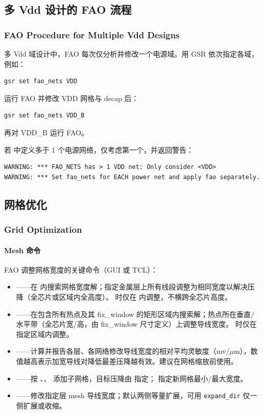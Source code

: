 \label{fig:rh-fao-static-flow}

\subsection{多 Vdd 设计的 FAO 流程}
\subsubsection*{FAO Procedure for Multiple Vdd Designs}

多 Vdd 域设计中，FAO 每次仅分析并修改一个电源域。用 GSR  依次指定各域，例如：
\begin{lstlisting}
gsr set fao_nets VDD
\end{lstlisting}
运行 FAO 并修改 VDD 网格与 decap 后：
\begin{lstlisting}
gsr set fao_nets VDD_B
\end{lstlisting}
再对 VDD\_B 运行 FAO。

若  中定义多于 1 个电源网络，仅考虑第一个，并返回警告：
\begin{lstlisting}
WARNING: *** FAO_NETS has > 1 VDD net: Only consider <VDD>
WARNING: *** Set fao_nets for EACH power net and apply fao separately.
\end{lstlisting}

\subsection{网格优化}
\subsubsection*{Grid Optimization}

\paragraph{Mesh 命令}
FAO 调整网格宽度的关键命令（GUI 或 TCL）：
\begin{itemize}
  \item {}——在  内搜索网格宽度解；指定金属层上所有线段调整为相同宽度以解决压降（全芯片或区域内全高度）。 时仅在  内调整，不横跨全芯片高度。
  \item {}——在包含所有热点及其 fix\_window 的矩形区域内搜索解；热点所在垂直/水平带（全芯片宽/高，由 fix\_window 尺寸定义）上调整导线宽度。 时仅在指定区域内调整。
  \item {}——计算并报告各层、各网络修改导线宽度的相对平均灵敏度（mv/$\mu$m），数值越高表示加宽导线对降低最差压降越有效。建议在网格缩放前使用。
  \item {}——按 、、 添加子网格，目标压降由  指定； 指定新网格最小/最大宽度。
  \item {}——修改指定层 mesh 导线宽度；默认两侧等量扩展，可用 \texttt{expand\_dir} 仅一侧扩展或收缩。
\end{itemize}


